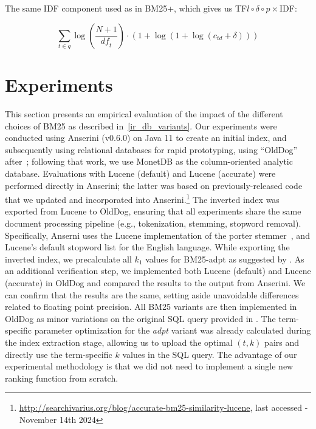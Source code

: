 The same IDF component used as in BM25+, which gives us TF$l\circ\delta\circ p\times$IDF: 

\begin{equation}
	\label{tf-ldp-idf}
	\sum_{t\in q}\log\left(\frac{N+1}{\mathit{df}_t}\right)\cdot\left(1+\log\left(1+\log\left(c_{\mathit{td}}+\delta\right)\right)\right)
\end{equation}

\section{Experiments}
This section presents an empirical evaluation of the impact of the different choices of BM25 as described in~\cref{ir_db_variants}.
Our experiments were conducted using Anserini (v0.6.0) on Java 11 to create an initial index, and subsequently using relational databases for rapid prototyping, using ``OldDog''~\citep{olddog-docker} after~\citet{OldDog}; following that work, we use MonetDB as the column-oriented analytic database. Evaluations with Lucene (default) and Lucene (accurate) were performed directly in Anserini; the latter was based on previously-released code that we updated and incorporated into Anserini.\footnote{\url{http://searchivarius.org/blog/accurate-bm25-similarity-lucene}, last accessed - November 14th 2024} The inverted index was exported from Lucene to OldDog, ensuring that all experiments share the same document processing pipeline (e.g., tokenization, stemming, stopword removal). Specifically, Anserni uses the Lucene implementation of the porter stemmer~\citep{porter}, and Lucene's default stopword list for the English language. While exporting the inverted index, we precalculate all $k_1$ values for BM25-adpt as suggested by \citet{bm25-adpt}. As an additional verification step, we implemented both Lucene (default) and Lucene (accurate) in OldDog and compared the results to the output from Anserini. We can confirm that the results are the same, setting aside unavoidable differences related to floating point precision. All BM25 variants are then implemented in OldDog as minor variations on the original SQL query provided in \citet{OldDog}. The term-specific parameter optimization for the \emph{adpt} variant was already calculated during the index extraction stage, allowing us to upload the optimal $(t, k)$ pairs and directly use the term-specific $k$ values in the SQL query. The advantage of our experimental methodology is that we did not need to implement a single new ranking function from scratch.

